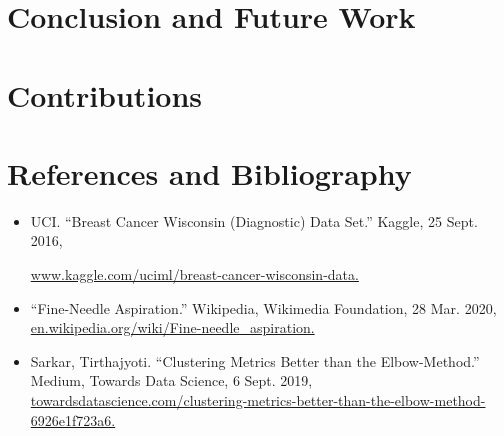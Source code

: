 \documentclass[15pt]{cup-pan}
\begin{document}
\begin{adjustwidth*}{-1.5in}{-0in}



\newpage 

\section{Conclusion and Future Work}

\bigskip

\section{Contributions}

\newpage 

\section{References and Bibliography}

\bigskip



\begin{itemize}

  \item 
UCI. “Breast Cancer Wisconsin (Diagnostic) Data Set.” Kaggle, 25 Sept. 2016, 

\url{www.kaggle.com/uciml/breast-cancer-wisconsin-data.}

\bigskip

  \item “Fine-Needle Aspiration.” Wikipedia, Wikimedia Foundation, 28 Mar. 2020,  \url{en.wikipedia.org/wiki/Fine-needle_aspiration.} 
  
  \bigskip
  
  \item Sarkar, Tirthajyoti. “Clustering Metrics Better than the Elbow-Method.” Medium, Towards Data Science, 6 Sept. 2019, \url{towardsdatascience.com/clustering-metrics-better-than-the-elbow-method-6926e1f723a6.}
  

\end{itemize}
\end{adjustwidth*}
\end{document}
